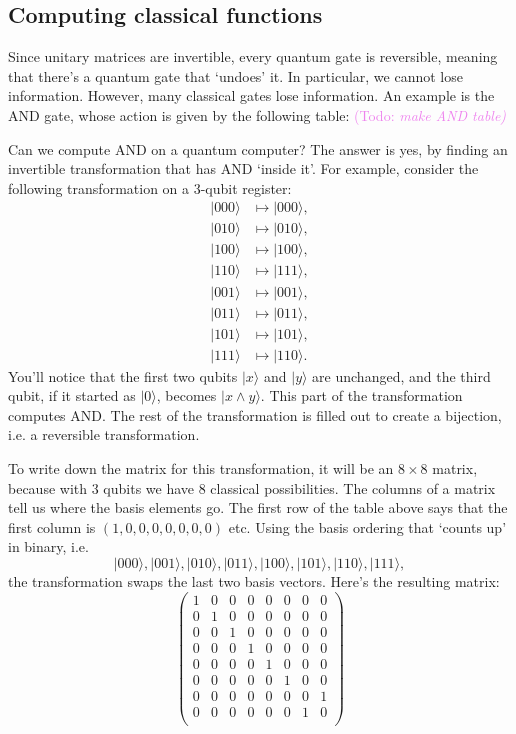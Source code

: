 \documentclass{article}
\theoremstyle{plain}
\theoremstyle{definition}
\theoremstyle{remark}
\numberwithin{theorem}{section}
\newcommand{\KS}[1]{\textcolor{violet}{{\sf (Todo:} {\sl{#1})}}}
\newcommand{\KS}[1]{}
\begin{document}
\subsection{Computing classical functions}

Since unitary matrices are invertible, every quantum gate is reversible, meaning that there's a quantum gate that `undoes' it.  In particular, we cannot lose information.  However, many classical gates lose information.  An example is the AND gate, whose action is given by the following table:
\KS{make AND table}

Can we compute AND on a quantum computer?  The answer is yes, by finding an invertible transformation that has AND `inside it'.  For example, consider the following transformation on a 3-qubit register:
\begin{align*}
|000\rangle &\mapsto |000 \rangle, \\
|010\rangle &\mapsto |010 \rangle,\\
|100\rangle &\mapsto |100 \rangle,\\
|110\rangle &\mapsto |111 \rangle,\\
|001\rangle &\mapsto |001 \rangle, \\
|011\rangle &\mapsto |011 \rangle,\\
|101\rangle &\mapsto |101 \rangle,\\
|111\rangle &\mapsto |110 \rangle.
\end{align*}
You'll notice that the first two qubits $|x\rangle$ and $|y\rangle$ are unchanged, and the third qubit, if it started as $|0\rangle$, becomes $|x \wedge y \rangle$.  This part of the transformation computes AND.  The rest of the transformation is filled out to create a bijection, i.e. a reversible transformation.

To write down the matrix for this transformation, it will be an $8 \times 8$ matrix, because with $3$ qubits we have $8$ classical possibilities.  The columns of a matrix tell us where the basis elements go.  The first row of the table above says that the first column is $(1,0,0,0,0,0,0,0)$ etc.  Using the basis ordering that `counts up' in binary, i.e. 
\[
|000\rangle,
|001\rangle,
|010\rangle,
|011\rangle,
|100\rangle,
|101\rangle,
|110\rangle,
|111\rangle,
\]
the transformation swaps the last two basis vectors.  Here's the resulting matrix:
\[
\begin{pmatrix}
1 & 0 & 0 & 0 & 0 & 0 & 0 & 0  \\
0 & 1 & 0 & 0 & 0 & 0 & 0 & 0  \\
0 & 0 & 1 & 0 & 0 & 0 & 0 & 0  \\
0 & 0 & 0 & 1 & 0 & 0 & 0 & 0  \\
0 & 0 & 0 & 0 & 1 & 0 & 0 & 0  \\
0 & 0 & 0 & 0 & 0 & 1 & 0 & 0  \\
0 & 0 & 0 & 0 & 0 & 0 & 0 & 1  \\
0 & 0 & 0 & 0 & 0 & 0 & 1 & 0  \\
\end{pmatrix}
\]
\end{document}
